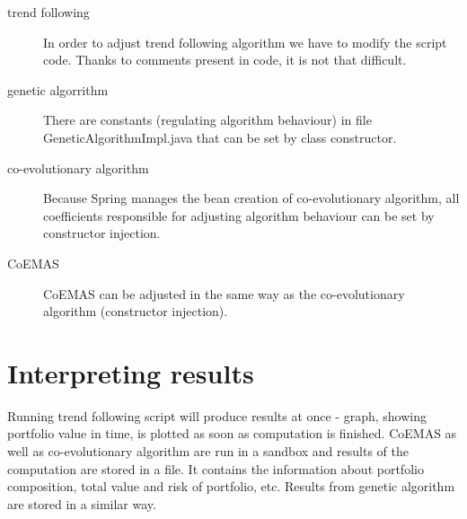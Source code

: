 \begin{description}
 \item [trend following]
      In order to adjust trend following algorithm we have to modify the script code.
      Thanks to comments present in code, it is not that difficult.
  \item [genetic algorrithm]
      There are constants (regulating algorithm behaviour) in file GeneticAlgorithmImpl.java that can be set by class constructor. 
  \item [co-evolutionary algorithm]
      Because Spring manages the bean creation of co-evolutionary algorithm, all coefficients responsible for adjusting algorithm behaviour can be set by constructor injection. 
  \item [CoEMAS] 
      CoEMAS can be adjusted in the same way as the co-evolutionary algorithm (constructor injection).
\end{description}


\section{Interpreting results}

Running trend following script will produce results at once - graph, showing portfolio value in time, is plotted as soon as computation is finished.
CoEMAS as well as co-evolutionary algorithm are run in a sandbox and results of the computation are stored in a file.
It contains the information about portfolio composition, total value and risk of portfolio, etc. 
Results from genetic algorithm are stored in a similar way. 

